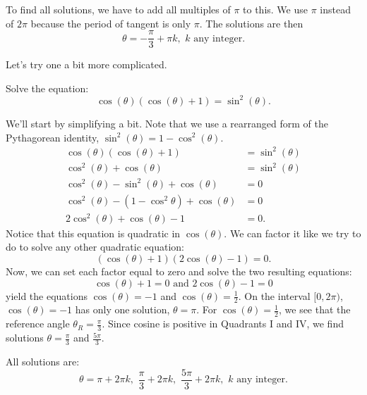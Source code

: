 \documentclass[nooutcomes]{ximera}
\begin{document}
\begin{example}
\begin{explanation}
		To find all solutions, we have to add all multiples of $\pi$ to this. We use $\pi$ instead of $2\pi$ because the period of tangent is only $\pi$. 
		The solutions are then $$ \theta = -\frac{\pi}{3}+ \pi k , \,\, k \textrm{ any integer}. $$
				
	\end{explanation}
\end{example}

Let's try one a bit more complicated.
\begin{example}
	Solve the equation: \[ \cos(\theta) \left( \cos(\theta) + 1\right) = \sin^2(\theta). \]
	\begin{explanation}
		We'll start by simplifying a bit. Note that we use a rearranged form of the Pythagorean identity, $\sin^2(\theta)  = 1 - \cos^2(\theta)$. 
		\begin{align*}
			\cos(\theta) \left( \cos(\theta) + 1\right) &= \sin^2(\theta) \\
			\cos^2(\theta) + \cos(\theta) &= \sin^2(\theta) \\
			\cos^2(\theta) - \sin^2(\theta) + \cos(\theta) &= 0\\
			\cos^2(\theta) - \left(1-\cos^2\theta\right) + \cos(\theta) &= 0\\
			2\cos^2(\theta) + \cos(\theta) - 1 &= 0.
		\end{align*}
		Notice that this equation is quadratic in $\cos(\theta)$.  We can factor it like we try to do to solve any other quadratic equation:
		\[ \left( \cos(\theta) + 1 \right) \left( 2 \cos(\theta) - 1\right) = 0.\]
		Now, we can set each factor equal to zero and solve the two resulting equations:
		$$\cos(\theta) + 1 = 0 \text{ and } 2\cos(\theta) - 1 = 0$$
		yield the equations $\cos(\theta) = -1$ and $\cos(\theta) = \frac{1}{2}$. 
		On the interval $[0, 2\pi)$, $\cos(\theta) = -1$ has only one solution, $\theta = {\pi}$.  
		For $\cos(\theta) = \frac{1}{2}$, we see that the reference angle $\theta_R = {\frac{\pi}{3}}$.  Since cosine is positive in Quadrants I and IV,
		we find solutions $\theta = \frac{\pi}{3}$ and $\frac{5\pi}{3}$.
		
		All solutions are:
		\[ \theta = \pi + 2 \pi k, \,\, \frac{\pi}{3}+ 2 \pi k ,\,\, \frac{5\pi}{3} + 2\pi k, \,\, k \textrm{ any integer.} \]
	\end{explanation}
\end{example}
\end{document}
